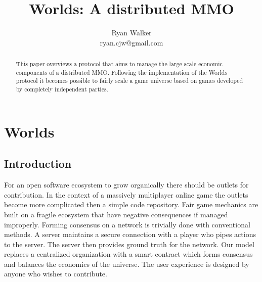\documentclass[runningheads,a4paper]{llncs}
\begin{document}
\def \SystemName {Worlds} %

\mainmatter  %

\title{\SystemName: A distributed MMO}

\author{Ryan Walker\\
				ryan.cjw@gmail.com}

\institute{} %

\maketitle

\begin{abstract}
This paper overviews a protocol that aims to manage the large scale economic components of a distributed MMO. Following the implementation of the Worlds protocol it becomes possible to fairly scale a game universe based on games developed by completely independent parties. 
\end{abstract}

\section{Worlds}
\subsection{Introduction}
For an open software ecosystem to grow organically there should be outlets for contribution. In the context of a massively multiplayer online game the outlets become more complicated then a simple code repository. Fair game mechanics are built on a fragile ecosystem that have negative consequences if managed improperly. Forming consensus on a network is trivially done with conventional methods. A server maintains a secure connection with a player who pipes actions to the server. The server then provides ground truth for the network. Our model replaces a centralized organization with a smart contract which forms consensus and balances the economics of the universe. The user experience is designed by anyone who wishes to contribute.
\end{document}
